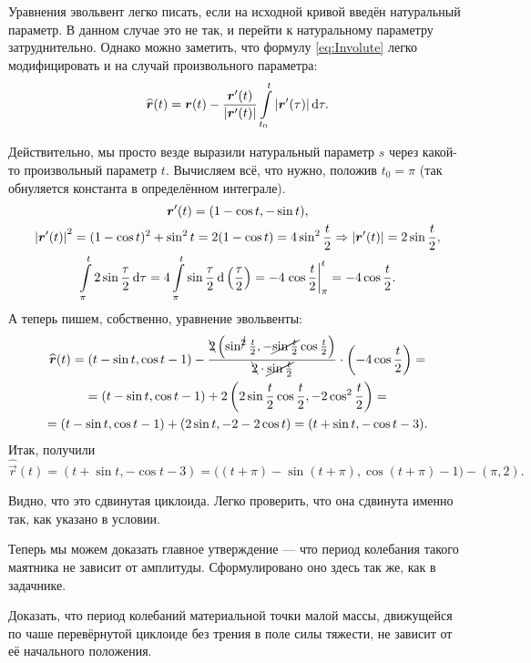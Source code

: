 \begin{solution}
	Уравнения эвольвент легко писать, если на исходной кривой введён натуральный параметр. В данном случае это не так, и перейти к натуральному параметру затруднительно. Однако можно заметить, что формулу \eqref{eq:Involute} легко модифицировать и на случай произвольного параметра:
	\[
		\widehat{\boldsymbol{r}}(t) = \boldsymbol{r}(t) - \frac{\boldsymbol{r}^\prime(t)}{\left\lvert\boldsymbol{r}^\prime(t)\right\rvert}\int\limits_{t_0}^t\left\lvert\boldsymbol{r}^\prime(\tau)\right\rvert\mathop{}\!\mathrm{d}\tau.
	\]

	Действительно, мы просто везде выразили натуральный параметр $s$ через какой-то произвольный параметр $t$. Вычисляем всё, что нужно, положив $t_0 = \pi$ (так обнуляется константа в определённом интеграле).
	\begin{gather*}
		\boldsymbol{r}^\prime(t) = (1 - \cos t, -\sin t),\\
		\left\lvert\boldsymbol{r}^\prime(t)\right\rvert^2 = (1 - \cos t)^2 + \sin^2t = 2(1 - \cos t) = 4\sin^2\frac{t}{2} \Rightarrow \left\lvert\boldsymbol{r}^\prime(t)\right\rvert = 2\sin\frac{t}{2},\\
		\int\limits_\pi^t 2\sin\frac{\tau}{2}\mathop{}\!\mathrm{d}\tau = 4\int\limits_\pi^t\sin\frac{\tau}{2}\mathop{}\!\mathrm{d}\left(\frac{\tau}{2}\right) = -4\left.\cos\frac{t}{2}\right|_\pi^t = -4\cos\frac{t}{2}.
	\end{gather*}
	А теперь пишем, собственно, уравнение эвольвенты:
	\begin{multline*}
		\widehat{\boldsymbol{r}}(t) = (t - \sin t, \cos t - 1) - \frac{\bcancel{2}\left(\sin^{\cancel{2}}\frac{t}{2}, -\cancel{\sin\frac{t}{2}}\cos\frac{t}{2}\right)}{\bcancel{2} \cdot \cancel{\sin\frac{t}{2}}} \cdot \left(-4\cos\frac{t}{2}\right) =\\ = (t - \sin t, \cos t - 1) + 2\left(2\sin\frac{t}{2}\cos\frac{t}{2}, -2\cos^2\frac{t}{2}\right) =\\ = (t - \sin t, \cos t - 1) + (2\sin t, -2 - 2\cos t) = (t + \sin t, -\cos t - 3).
	\end{multline*}
	Итак, получили \[\widehat{\vec{r}}(t) = (t + \sin t, -\cos t - 3) = \big((t + \pi) - \sin(t + \pi), \cos(t + \pi) - 1\big) - (\pi, 2).\]

	Видно, что это сдвинутая циклоида. Легко проверить, что она сдвинута именно так, как указано в условии.
\end{solution}

Теперь мы можем доказать главное утверждение --- что период колебания такого маятника не зависит от амплитуды. Сформулировано оно здесь так же, как в задачнике.

\begin{problem}
	Доказать, что период колебаний материальной точки малой массы, движущейся по чаше перевёрнутой циклоиде без трения в поле силы тяжести, не зависит от её начального положения.
\end{problem}


